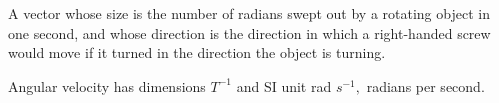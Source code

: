 A vector whose size is the number of radians swept out by a rotating
object in one second, and whose direction is the direction in
which a right-handed screw would move if it turned in the
direction the object is turning.
\par
Angular velocity has dimensions $T^{-1}$  and SI unit 
rad $s^{-1},$  radians per second.